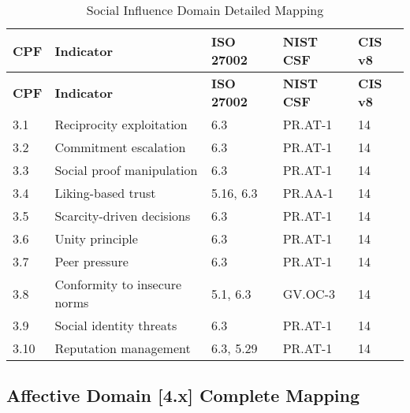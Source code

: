 \documentclass[11pt,a4paper]{article}
\begin{document}
\begin{longtable}{p{1cm}p{4cm}p{2.5cm}p{2.5cm}p{2cm}}
\caption{Social Influence Domain Detailed Mapping} \\
\toprule
\textbf{CPF} & \textbf{Indicator} & \textbf{ISO 27002} & \textbf{NIST CSF} & \textbf{CIS v8} \\
\midrule
\endfirsthead
\toprule
\textbf{CPF} & \textbf{Indicator} & \textbf{ISO 27002} & \textbf{NIST CSF} & \textbf{CIS v8} \\
\midrule
\endhead
\bottomrule
\endlastfoot

3.1 & Reciprocity exploitation & 6.3 & PR.AT-1 & 14 \\
3.2 & Commitment escalation & 6.3 & PR.AT-1 & 14 \\
3.3 & Social proof manipulation & 6.3 & PR.AT-1 & 14 \\
3.4 & Liking-based trust & 5.16, 6.3 & PR.AA-1 & 14 \\
3.5 & Scarcity-driven decisions & 6.3 & PR.AT-1 & 14 \\
3.6 & Unity principle & 6.3 & PR.AT-1 & 14 \\
3.7 & Peer pressure & 6.3 & PR.AT-1 & 14 \\
3.8 & Conformity to insecure norms & 5.1, 6.3 & GV.OC-3 & 14 \\
3.9 & Social identity threats & 6.3 & PR.AT-1 & 14 \\
3.10 & Reputation management & 6.3, 5.29 & PR.AT-1 & 14 \\

\end{longtable}

\subsection{Affective Domain [4.x] Complete Mapping}
\end{document}
